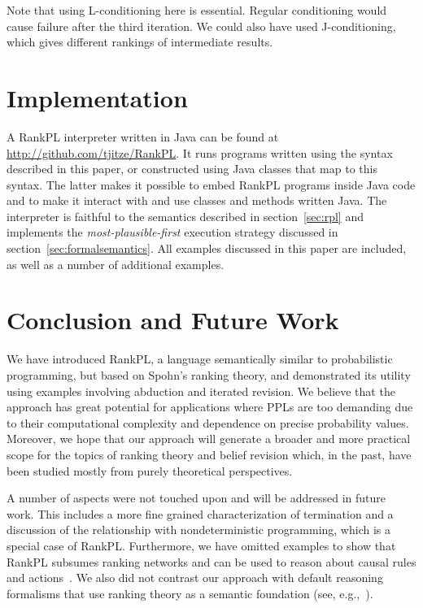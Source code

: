 \documentclass{llncs}
\begin{document}
Note that using L-conditioning here is essential.
Regular conditioning would cause failure after the third iteration. 
We could also have used J-conditioning, which gives different rankings of intermediate results.

\section{Implementation}\label{sec:implementation}

A RankPL interpreter written in Java can be found at \url{http://github.com/tjitze/RankPL}.
It runs programs written using the syntax described in this paper, 
	or constructed using Java classes that map to this syntax.
The latter makes it possible to embed RankPL programs inside Java code
	and to make it interact with and use classes and methods written Java.
The interpreter is faithful to the semantics described in section~\ref{sec:rpl} and
	implements the \emph{most-plausible-first} execution strategy discussed in section~\ref{sec:formalsemantics}.
All examples discussed in this paper are included, as well as a number of additional examples.

\section{Conclusion and Future Work}\label{sec:conclusion}

We have introduced RankPL, a language semantically similar to probabilistic programming,
	but based on Spohn's ranking theory,
	and demonstrated its utility using examples involving abduction and iterated revision.
We believe that the approach has great potential for applications
	where PPLs are too demanding due to their computational complexity and dependence on precise probability values.
Moreover, we hope that our approach will generate a broader and more practical scope for the topics of 
	ranking theory and belief revision which, in the past, have been studied mostly from purely theoretical perspectives.

A number of aspects were not touched upon and will be addressed in future work.
This includes a more fine grained characterization of termination
	and a discussion of the relationship with nondeterministic programming, 
	which is a special case of RankPL.
Furthermore, we have omitted examples to show that RankPL
	subsumes ranking networks 
	and can be used to reason about causal rules and actions~\cite{goldszmidt1996qualitative}.
We also did not contrast our approach 
	with default reasoning formalisms that use ranking theory as a semantic foundation (see, e.g.,~\cite{DBLP:conf/tark/Pearl90}).
\end{document}
